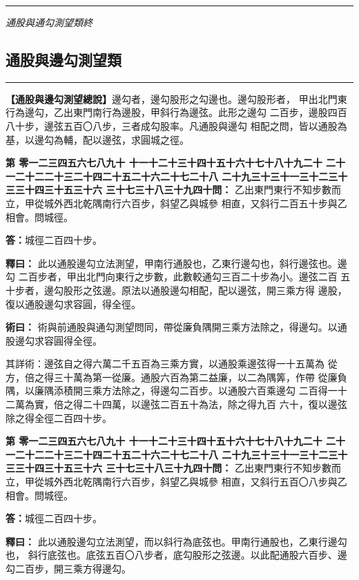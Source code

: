 \documentclass[11pt,a4paper]{article}
\newcommand{\longline}{\noindent\rule{\textwidth}{0.4pt}}
\newcounter{probnum}
\newcommand{\chnum}[1]{%
  \ifcase#1 零\or 一\or 二\or 三\or 四\or 五\or 六\or 七\or 八\or 九\or 十\or
    十一\or 十二\or 十三\or 十四\or 十五\or 十六\or 十七\or 十八\or 十九\or 二十\or
    二十一\or 二十二\or 二十三\or 二十四\or 二十五\or 二十六\or 二十七\or 二十八\or
    二十九\or 三十\or 三十一\or 三十二\or 三十三\or 三十四\or 三十五\or 三十六\or
    三十七\or 三十八\or 三十九\or 四十\fi}
\newcommand{\problem}[1]{\stepcounter{probnum}\par\noindent\textbf{第\chnum{\value{probnum}}問：}#1\par}
\newcommand{\answer}[1]{\par\noindent\textbf{答：}#1\par}
\newcommand{\shiyi}[1]{\par\noindent\textbf{釋曰：}#1\par}
\newcommand{\shuyue}[1]{\par\noindent\textbf{術曰：}#1\par}
\begin{document}
\vspace{0.5cm}
\longline
\begin{center}
\textit{通股與通勾測望類終}
\end{center}

\newpage
\setcounter{probnum}{0}

\subsection*{通股與邊勾測望類}
\vspace{0.3cm}
\longline
\vspace{0.3cm}

\noindent
\textbf{【通股與邊勾測望總說】}邊勾者，邊勾股形之勾邊也。邊勾股形者，
甲出北門東行為邊勾，乙出東門南行為邊股，甲斜行為邊弦。此形之邊勾
二百步，邊股四百八十步，邊弦五百〇八步，三者成勾股率。凡通股與邊勾
相配之問，皆以通股為基，以邊勾為輔，配以邊弦，求圓城之徑。

\problem{
乙出東門東行不知步數而立，甲從城外西北乾隅南行六百步，斜望乙與城參
相直，又斜行二百五十步與乙相會。問城徑。
}

\answer{城徑二百四十步。}

\shiyi{
此以通股邊勾立法測望，甲南行通股也，乙東行邊勾也，斜行邊弦也。邊勾
二百步者，甲出北門向東行之步數，此數較通勾三百二十步為小。邊弦二百
五十步者，邊勾股形之弦邊。原法以通股邊勾相配，配以邊弦，開三乘方得
邊股，復以通股邊勾求容圓，得全徑。
}

\shuyue{
術與前通股與通勾測望問同，帶從廉負隅開三乘方法除之，得邊勾。以通
股邊勾求容圓得全徑。

其詳術：邊弦自之得六萬二千五百為三乘方實，以通股乘邊弦得一十五萬為
從方，倍之得三十萬為第一從廉。通股六百為第二益廉，以二為隅筭，作帶
從廉負隅，以廉隅添積開三乘方法除之，得邊勾二百步。以通股六百乘邊勾
二百得一十二萬為實，倍之得二十四萬，以邊弦二百五十為法，除之得九百
六十，復以邊弦除之得全徑二百四十步。
}

\vspace{0.3cm}
\problem{
乙出東門東行不知步數而立，甲從城外西北乾隅南行六百步，斜望乙與城參
相直，又斜行五百〇八步與乙相會。問城徑。
}

\answer{城徑二百四十步。}

\shiyi{
此以通股邊勾立法測望，而以斜行為底弦也。甲南行通股也，乙東行邊勾也，
斜行底弦也。底弦五百〇八步者，底勾股形之弦邊。以此配通股六百步、邊
勾二百步，開三乘方得邊勾。
}
\end{document}
